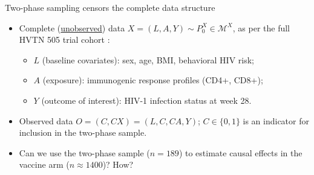 \documentclass{beamer}
\begin{document}

\begin{frame}[c]{Two-phase sampling censors the complete data structure}

\begin{center}
\begin{itemize}
  \itemsep10pt
  \item Complete (\underline{unobserved}) data $X = (L, A, Y) \sim P_0^X \in
    \mathcal{M}^X$, as per the full HVTN 505 trial cohort
    \citep{hammer2013efficacy}:
    \vspace{1em}
    \begin{itemize}
      \itemsep8pt
      \item $L$ (baseline covariates): sex, age, BMI, behavioral HIV risk;
      \item $A$ (exposure): immunogenic response profiles (CD4+, CD8+);
      \item $Y$ (outcome of interest): HIV-1 infection status at week 28.
    \end{itemize}
  \item Observed data $O = (C, C X) = (L, C, C A, Y)$; $C \in \{0,1\}$ is an
    indicator for inclusion in the two-phase sample.
  \item Can we use the two-phase sample ($n = 189$) to estimate causal effects
    in the vaccine arm ($n \approx 1400$)? How?
\end{itemize}
\end{center}


\end{frame}

\end{document}
